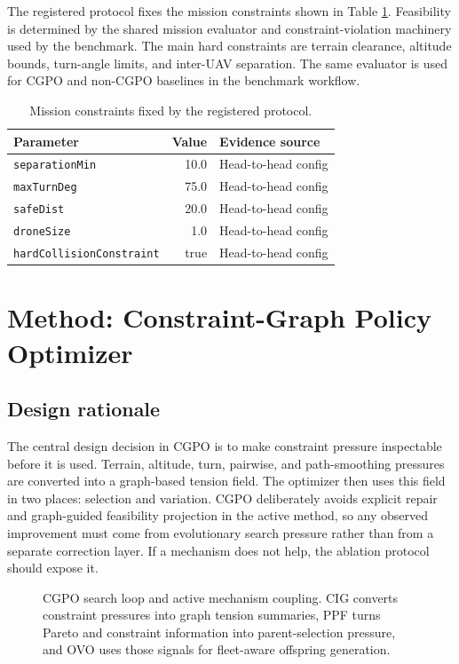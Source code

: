 \documentclass[a4paper,fleqn]{cas-dc}
\begin{document}
The registered protocol fixes the mission constraints shown in Table \ref{tab:constraints}. Feasibility is determined by the shared mission evaluator and constraint-violation machinery used by the benchmark. The main hard constraints are terrain clearance, altitude bounds, turn-angle limits, and inter-UAV separation. The same evaluator is used for CGPO and non-CGPO baselines in the benchmark workflow.

\begin{table}[t]
\centering
\small
\caption{Mission constraints fixed by the registered protocol.}
\label{tab:constraints}
\begin{tabular}{lrl}
\toprule
Parameter & Value & Evidence source \\
\midrule
\texttt{separationMin} & 10.0 & Head-to-head config \\
\texttt{maxTurnDeg} & 75.0 & Head-to-head config \\
\texttt{safeDist} & 20.0 & Head-to-head config \\
\texttt{droneSize} & 1.0 & Head-to-head config \\
\texttt{hardCollisionConstraint} & true & Head-to-head config \\
\bottomrule
\end{tabular}
\end{table}

\section{Method: Constraint-Graph Policy Optimizer}
\label{sec:method}

\subsection{Design rationale}

The central design decision in CGPO is to make constraint pressure inspectable before it is used. Terrain, altitude, turn, pairwise, and path-smoothing pressures are converted into a graph-based tension field. The optimizer then uses this field in two places: selection and variation. CGPO deliberately avoids explicit repair and graph-guided feasibility projection in the active method, so any observed improvement must come from evolutionary search pressure rather than from a separate correction layer. If a mechanism does not help, the ablation protocol should expose it.

\begin{figure}[t]
\centering
\resizebox{\textwidth}{!}{}
\caption{CGPO search loop and active mechanism coupling. CIG converts constraint pressures into graph tension summaries, PPF turns Pareto and constraint information into parent-selection pressure, and OVO uses those signals for fleet-aware offspring generation.}
\label{fig:cgpo-method-tikz}
\end{figure}
\end{document}
